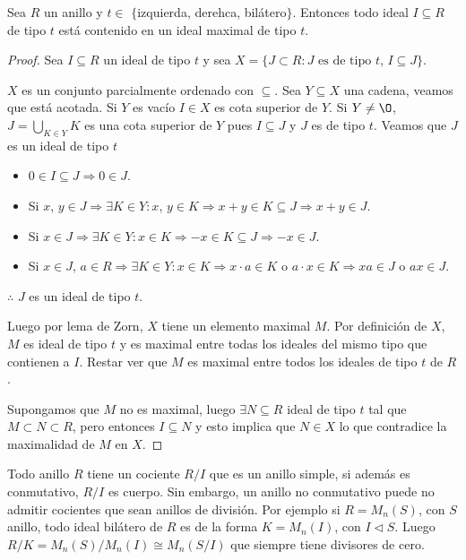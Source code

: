\begin{theorem}
    Sea \(R\) un anillo y \(t \in\) \(\{\)izquierda, derehca, bilátero\(\}\). Entonces todo ideal \(I \subseteq R\) de tipo \(t\) está contenido en un ideal maximal de tipo \(t\). \begin{proof}
        Sea \(I \subseteq R\) un ideal de tipo \(t\) y sea \(X = \{ J \subset R : J \text{ es de tipo } t \text{, } I \subseteq J\}\).

        \(X\) es un conjunto parcialmente ordenado con \(\subseteq\). Sea \(Y \subseteq X\) una cadena, veamos que está acotada. Si \(Y\) es vacío \(I \in X\) es cota superior de \(Y\).
        Si \(Y \neq \O\), \(J = \bigcup_{K \in Y} K\) es una cota superior de \(Y\) pues \(I \subseteq J\) y \(J\) es de tipo \(t\).
        Veamos que \(J\) es un ideal de tipo \(t\) \begin{itemize}
            \item \(0 \in I \subseteq J \Rightarrow 0 \in J\).
            \item Si \(x\), \(y \in J \Rightarrow \exists K \in Y : x\), \(y \in K \Rightarrow x+y \in K \subseteq J \Rightarrow x+y \in J\).
            \item Si \(x \in J \Rightarrow \exists K \in Y : x \in K \Rightarrow -x \in K \subseteq J \Rightarrow -x \in J\).
            \item Si \(x \in J\), \(a \in R \Rightarrow \exists K \in Y : x \in K \Rightarrow x \cdot a \in K\) o \(a \cdot x \in K \Rightarrow xa \in J\) o \(ax \in J\).
        \end{itemize}
        \(\therefore\) \(J\) es un ideal de tipo \(t\).

        Luego por lema de Zorn, \(X\) tiene un elemento maximal \(M\). Por definición de \(X\), \(M\) es ideal de tipo \(t\) y es maximal entre todas los ideales del mismo tipo que contienen a \(I\). Restar ver que \(M\) es maximal entre todos los ideales de tipo \(t\) de \(R\).

        Supongamos que \(M\) no es maximal, luego \(\exists N \subseteq R\) ideal de tipo \(t\) tal que \(M \subset N \subset R\), pero entonces \(I \subseteq N\) y esto implica que \(N \in X\) lo que contradice la maximalidad de \(M\) en \(X\).
    \end{proof}
\end{theorem}

\begin{note}
    Todo anillo \(R\) tiene un cociente \(R/I\) que es un anillo simple, si además es conmutativo, \(R/I\) es cuerpo. Sin embargo, un anillo no conmutativo puede no admitir cocientes que sean anillos de división.
    Por ejemplo si \(R = M_n(S)\), con \(S\) anillo, todo ideal bilátero de \(R\) es de la forma \(K = M_n(I)\), con \(I \triangleleft S\).
    Luego \(R/K = M_n(S)/M_n(I) \cong M_n(S/I)\) que siempre tiene divisores de cero.
\end{note}

